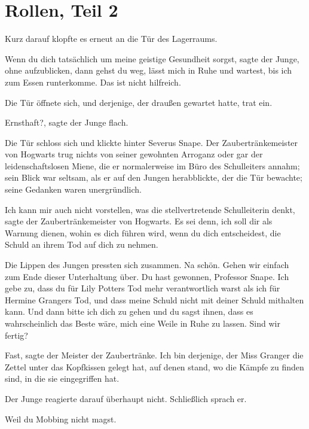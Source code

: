 \chapter{Rollen, Teil 2}

Kurz darauf klopfte es erneut an die Tür des Lagerraums.

\glqq{}Wenn du dich tatsächlich um meine geistige Gesundheit sorgst\grqq{}, sagte
der Junge, ohne aufzublicken, \glqq{}dann gehst du weg, lässt mich in Ruhe und
wartest, bis ich zum Essen runterkomme. Das ist nicht hilfreich.\grqq{}

Die Tür öffnete sich, und derjenige, der draußen gewartet hatte, trat ein.

\glqq{}Ernsthaft?\grqq{}, sagte der Junge flach.

Die Tür schloss sich und klickte hinter Severus Snape. Der Zaubertränkemeister
von Hogwarts trug nichts von seiner gewohnten Arroganz oder gar der
leidenschaftslosen Miene, die er normalerweise im Büro des Schulleiters annahm;
sein Blick war seltsam, als er auf den Jungen herabblickte, der die Tür
bewachte; seine Gedanken waren unergründlich.

\glqq{}Ich kann mir auch nicht vorstellen, was die stellvertretende Schulleiterin
denkt\grqq{}, sagte der Zaubertränkemeister von Hogwarts. \glqq{}Es sei denn, ich
soll dir als Warnung dienen, wohin es dich führen wird, wenn du dich
entscheidest, die Schuld an ihrem Tod auf dich zu nehmen.\grqq{}

Die Lippen des Jungen pressten sich zusammen. \glqq{}Na schön. Gehen wir einfach
zum Ende dieser Unterhaltung über. Du hast gewonnen, Professor Snape. Ich gebe
zu, dass du für Lily Potters Tod mehr verantwortlich warst als ich für Hermine
Grangers Tod, und dass meine Schuld nicht mit deiner Schuld mithalten kann. Und
dann bitte ich dich zu gehen und du sagst ihnen, dass es wahrscheinlich das
Beste wäre, mich eine Weile in Ruhe zu lassen. Sind wir fertig?\grqq{}

\glqq{}Fast\grqq{}, sagte der Meister der Zaubertränke. \glqq{}Ich bin derjenige,
der Miss Granger die Zettel unter das Kopfkissen gelegt hat, auf denen stand, wo
die Kämpfe zu finden sind, in die sie eingegriffen hat.\grqq{}

Der Junge reagierte darauf überhaupt nicht. Schließlich sprach er.

\glqq{}Weil du Mobbing nicht magst.\grqq{}

